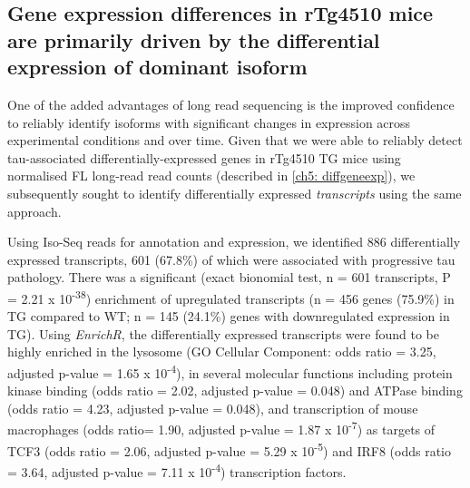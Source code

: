 \clearpage
\subsection{Gene expression differences in rTg4510 mice are primarily driven by the differential expression of dominant isoform}
One of the added advantages of long read sequencing is the improved confidence to reliably identify isoforms with significant changes in expression across experimental conditions and over time. Given that we were able to reliably detect tau-associated differentially-expressed genes in rTg4510 TG mice using normalised FL long-read read counts (described in \cref{ch5: diffgeneexp}), we subsequently sought to identify differentially expressed \textit{transcripts} using the same approach. 

Using Iso-Seq reads for annotation and expression, we identified 886 differentially expressed transcripts, 601 (67.8\%) of which were associated with progressive tau pathology. There was a significant (exact bionomial test, n = 601 transcripts, P = 2.21 x 10\textsuperscript{-38}) enrichment of upregulated transcripts (n = 456 genes (75.9\%) in TG compared to WT; n = 145 (24.1\%) genes with downregulated expression in TG). Using \textit{EnrichR}, the differentially expressed transcripts were found to be highly enriched in the lysosome (GO Cellular Component: odds ratio = 3.25, adjusted p-value = 1.65 x 10\textsuperscript{-4}), in several molecular functions including protein kinase binding (odds ratio = 2.02, adjusted p-value = 0.048) and ATPase binding (odds ratio = 4.23, adjusted p-value = 0.048), and transcription of mouse macrophages (odds ratio= 1.90, adjusted p-value = 1.87 x 10\textsuperscript{-7}) as targets of TCF3 (odds ratio = 2.06, adjusted p-value = 5.29 x 10\textsuperscript{-5}) and IRF8 (odds ratio = 3.64, adjusted p-value = 7.11 x 10\textsuperscript{-4}) transcription factors.  


